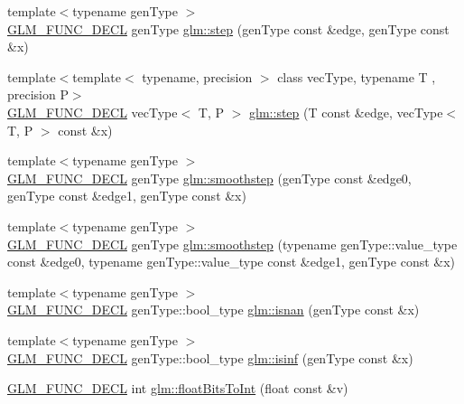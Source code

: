 \begin{DoxyCompactItemize}
\item 
{\footnotesize template$<$typename gen\+Type $>$ }\\\hyperlink{setup_8hpp_ab2d052de21a70539923e9bcbf6e83a51}{G\+L\+M\+\_\+\+F\+U\+N\+C\+\_\+\+D\+E\+CL} gen\+Type \hyperlink{group__core__func__common_gaf21c84759af7799f573865f70c2f0a86}{glm\+::step} (gen\+Type const \&edge, gen\+Type const \&x)
\item 
{\footnotesize template$<$template$<$ typename, precision $>$ class vec\+Type, typename T , precision P$>$ }\\\hyperlink{setup_8hpp_ab2d052de21a70539923e9bcbf6e83a51}{G\+L\+M\+\_\+\+F\+U\+N\+C\+\_\+\+D\+E\+CL} vec\+Type$<$ T, P $>$ \hyperlink{group__core__func__common_gae830a682901c0ba63c92a7d201bba007}{glm\+::step} (T const \&edge, vec\+Type$<$ T, P $>$ const \&x)
\item 
{\footnotesize template$<$typename gen\+Type $>$ }\\\hyperlink{setup_8hpp_ab2d052de21a70539923e9bcbf6e83a51}{G\+L\+M\+\_\+\+F\+U\+N\+C\+\_\+\+D\+E\+CL} gen\+Type \hyperlink{group__core__func__common_ga754103c8d2cdaf40f71429252457c10a}{glm\+::smoothstep} (gen\+Type const \&edge0, gen\+Type const \&edge1, gen\+Type const \&x)
\item 
{\footnotesize template$<$typename gen\+Type $>$ }\\\hyperlink{setup_8hpp_ab2d052de21a70539923e9bcbf6e83a51}{G\+L\+M\+\_\+\+F\+U\+N\+C\+\_\+\+D\+E\+CL} gen\+Type \hyperlink{group__core__func__common_ga1e7b9e668a0bd2f494a1d49b871a50ea}{glm\+::smoothstep} (typename gen\+Type\+::value\+\_\+type const \&edge0, typename gen\+Type\+::value\+\_\+type const \&edge1, gen\+Type const \&x)
\item 
{\footnotesize template$<$typename gen\+Type $>$ }\\\hyperlink{setup_8hpp_ab2d052de21a70539923e9bcbf6e83a51}{G\+L\+M\+\_\+\+F\+U\+N\+C\+\_\+\+D\+E\+CL} gen\+Type\+::bool\+\_\+type \hyperlink{group__core__func__common_ga8a9dec5200888766fbcb51b6a5898728}{glm\+::isnan} (gen\+Type const \&x)
\item 
{\footnotesize template$<$typename gen\+Type $>$ }\\\hyperlink{setup_8hpp_ab2d052de21a70539923e9bcbf6e83a51}{G\+L\+M\+\_\+\+F\+U\+N\+C\+\_\+\+D\+E\+CL} gen\+Type\+::bool\+\_\+type \hyperlink{group__core__func__common_ga9fce6a337c7e8ad089b9dc17c70cb873}{glm\+::isinf} (gen\+Type const \&x)
\item 
\hyperlink{setup_8hpp_ab2d052de21a70539923e9bcbf6e83a51}{G\+L\+M\+\_\+\+F\+U\+N\+C\+\_\+\+D\+E\+CL} int \hyperlink{group__core__func__common_gadc6a536a7bef046c3293d2ccad6d9ca2}{glm\+::float\+Bits\+To\+Int} (float const \&v)

\end{DoxyCompactItemize}
